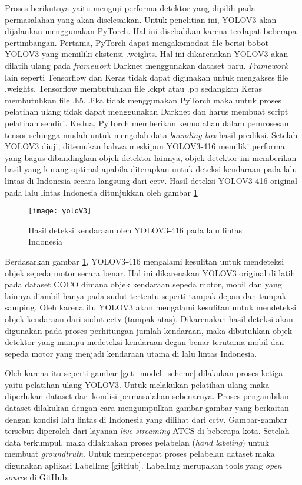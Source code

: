 \documentclass[../thesis.tex]{subfiles}
\begin{document}
Proses berikutnya yaitu menguji performa detektor yang dipilih pada permasalahan yang akan diselesaikan. Untuk penelitian ini, YOLOV3 akan dijalankan menggunakan PyTorch. Hal ini disebabkan karena terdapat beberapa pertimbangan. Pertama, PyTorch dapat mengakomodasi file berisi bobot YOLOV3 yang memiliki ekstensi .weights. Hal ini dikarenakan YOLOV3 akan dilatih ulang pada \textit{framework} Darknet menggunakan dataset baru. \textit{Framework} lain seperti Tensorflow dan Keras tidak dapat digunakan untuk mengakses file .weights. Tensorflow membutuhkan file .ckpt atau .pb sedangkan Keras membutuhkan file .h5. Jika tidak menggunakan PyTorch maka untuk proses pelatihan ulang
tidak dapat menggunakan Darknet dan harus membuat script pelatihan sendiri. Kedua, PyTorch memberikan kemudahan dalam pemrosesan tensor sehingga mudah untuk mengolah data \textit{bounding box} hasil prediksi.
Setelah YOLOV3 diuji, ditemukan bahwa meskipun YOLOV3-416 memiliki performa yang bagus dibandingkan objek detektor lainnya, objek detektor ini memberikan hasil yang kurang optimal apabila diterapkan untuk deteksi kendaraan pada lalu lintas di Indonesia secara langsung dari cctv. Hasil deteksi YOLOV3-416 original pada lalu lintas Indonesia ditunjukkan oleh gambar \ref{yoloV3_ori}

\begin{figure}[htp]
	\centering
	\texttt{[image: yoloV3]}
	\caption{Hasil deteksi kendaraan oleh YOLOV3-416 pada lalu lintas Indonesia}
	\label{yoloV3_ori}
\end{figure}
Berdasarkan gambar \ref{yoloV3_ori}, YOLOV3-416 mengalami kesulitan untuk mendeteksi objek sepeda motor secara benar. Hal ini dikarenakan YOLOV3 original di latih pada dataset COCO dimana objek kendaraan sepeda motor, mobil dan yang lainnya diambil hanya pada sudut tertentu seperti tampak depan dan tampak samping. Oleh karena itu YOLOV3 akan mengalami kesulitan untuk mendeteksi objek kendaraan dari sudut cctv (tampak atas). 
Dikarenakan hasil deteksi akan digunakan pada proses perhitungan jumlah kendaraan, maka dibutuhkan objek detektor yang mampu medeteksi kendaraan degan benar terutama mobil dan sepeda motor yang menjadi kendaraan utama di lalu lintas Indonesia.

Oleh karena itu seperti gambar \ref{get_model_scheme} dilakukan proses ketiga yaitu pelatihan ulang YOLOV3. Untuk melakukan pelatihan ulang maka diperlukan dataset dari kondisi permasalahan sebenarnya. Proses pengambilan dataset dilakukan dengan cara mengumpulkan gambar-gambar yang berkaitan dengan kondisi lalu lintas di Indonesia yang dilihat dari cctv. Gambar-gambar tersebut diperoleh dari layanan \textit{live streaming} ATCS di beberapa kota. 
Setelah data terkumpul, maka dilakuakan proses pelabelan (\textit{hand labeling}) untuk membuat \textit{groundtruth}. Untuk mempercepat proses pelabelan dataset maka digunakan aplikasi LabelImg [gitHub]. LabelImg merupakan tools yang \textit{open source} di GitHub.
\end{document}
